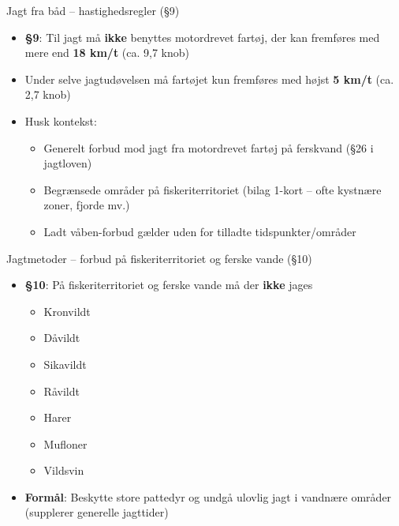 \begin{frame}{Jagt fra båd – hastighedsregler (§9)}
    \begin{itemize}
        \item \textbf{§9}: Til jagt må \textbf{ikke} benyttes motordrevet fartøj, der kan fremføres med mere end \textbf{18 km/t} (ca. 9,7 knob)
        \item Under selve jagtudøvelsen må fartøjet kun fremføres med højst \textbf{5 km/t} (ca. 2,7 knob)
        \item Husk kontekst:
          \begin{itemize}
            \item Generelt forbud mod jagt fra motordrevet fartøj på ferskvand (§26 i jagtloven)
            \item Begrænsede områder på fiskeriterritoriet (bilag 1-kort – ofte kystnære zoner, fjorde mv.)
            \item Ladt våben-forbud gælder uden for tilladte tidspunkter/områder
          \end{itemize}
    \end{itemize}
\end{frame}

\begin{frame}{Jagtmetoder – forbud på fiskeriterritoriet og ferske vande (§10)}
    \begin{itemize}
        \item \textbf{§10}: På fiskeriterritoriet og ferske vande må der \textbf{ikke} jages
          \begin{itemize}
            \item Kronvildt
            \item Dåvildt
            \item Sikavildt
            \item Råvildt
            \item Harer
            \item Mufloner
            \item Vildsvin
          \end{itemize}
        \item \textbf{Formål}: Beskytte store pattedyr og undgå ulovlig jagt i vandnære områder (supplerer generelle jagttider)
    \end{itemize}
\end{frame}

